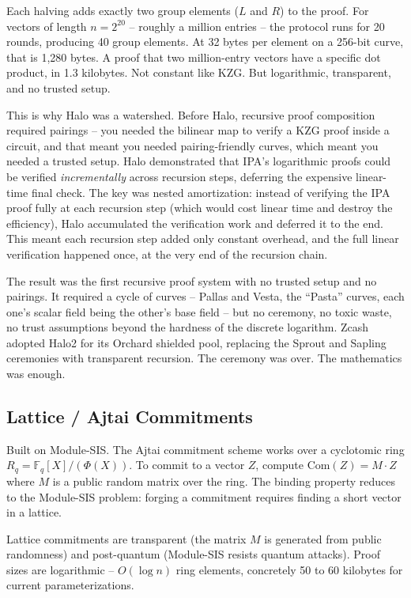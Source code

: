 \documentclass[
  11pt,
  openany]{report}
\begin{document}
Each halving adds exactly two group elements (\(L\) and \(R\)) to the proof. For
vectors of length \(n = 2^{20}\) -- roughly a million entries -- the protocol
runs for 20 rounds, producing 40 group elements. At 32 bytes per element on a
256-bit curve, that is 1,280 bytes. A proof that two million-entry vectors have
a specific dot product, in 1.3 kilobytes. Not constant like KZG. But
logarithmic, transparent, and no trusted setup.

This is why Halo was a watershed. Before Halo, recursive proof composition
required pairings -- you needed the bilinear map to verify a KZG proof inside a
circuit, and that meant you needed pairing-friendly curves, which meant you
needed a trusted setup. Halo demonstrated that IPA's logarithmic proofs could be
verified \emph{incrementally} across recursion steps, deferring the expensive
linear-time final check. The key was nested amortization: instead of verifying
the IPA proof fully at each recursion step (which would cost linear time and
destroy the efficiency), Halo accumulated the verification work and deferred it
to the end. This meant each recursion step added only constant overhead, and the
full linear verification happened once, at the very end of the recursion chain.

The result was the first recursive proof system with no trusted setup and no
pairings. It required a cycle of curves -- Pallas and Vesta, the ``Pasta''
curves, each one's scalar field being the other's base field -- but no ceremony,
no toxic waste, no trust assumptions beyond the hardness of the discrete
logarithm. Zcash adopted Halo2 for its Orchard shielded pool, replacing the
Sprout and Sapling ceremonies with transparent recursion. The ceremony was over.
The mathematics was enough.

\subsection{Lattice / Ajtai Commitments}\label{lattice-ajtai-commitments}

Built on Module-SIS. The Ajtai commitment scheme works over a cyclotomic ring
\(R_q = \mathbb{F}_q[X]/(\Phi(X))\). To commit to a vector \(Z\), compute
\(\text{Com}(Z) = M \cdot Z\) where \(M\) is a public random matrix over the
ring. The binding property reduces to the Module-SIS problem: forging a
commitment requires finding a short vector in a lattice.

Lattice commitments are transparent (the matrix \(M\) is generated from public
randomness) and post-quantum (Module-SIS resists quantum attacks). Proof sizes
are logarithmic -- \(O(\log n)\) ring elements, concretely 50 to 60 kilobytes
for current parameterizations.
\end{document}
